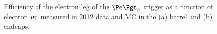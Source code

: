 \begin{figure}[htb]
\caption[Efficiency of the electron leg of the $\etau$ trigger as a function of electron $\pt$ measured
in 2012 data and MC.]{Efficiency of the electron leg of the $\etau$ trigger as a function of electron $\pt$ measured
in 2012 data and \ac{MC} in the (a) barrel and (b) endcaps.}
\label{fig:electrontrg}
\end{figure}

